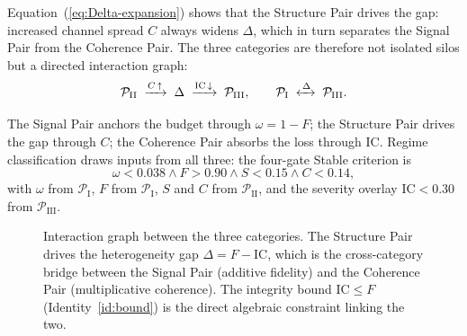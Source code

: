 \documentclass[
  aps,
  prd,
  twocolumn,
  superscriptaddress,
  nofootinbib,
  floatfix
]{revtex4-2}
\newcommand{\IC}{\mathrm{IC}}
\begin{document}
Equation~(\ref{eq:Delta-expansion}) shows that the Structure
Pair drives the gap: increased channel spread $C$ always widens
$\Delta$, which in turn separates the Signal Pair from the
Coherence Pair.  The three categories are therefore not isolated
silos but a directed interaction graph:
\begin{equation}\label{eq:graph}
  \mathcal{P}_{\mathrm{II}} \;\xrightarrow{C\,\uparrow}\; \Delta \;\xrightarrow{\IC\,\downarrow}\; \mathcal{P}_{\mathrm{III}},
  \qquad
  \mathcal{P}_{\mathrm{I}} \;\xleftrightarrow{\,\Delta\,}\; \mathcal{P}_{\mathrm{III}}.
\end{equation}

The Signal Pair anchors the budget through $\omega=1-F$; the
Structure Pair drives the gap through $C$; the Coherence Pair
absorbs the loss through $\IC$.  Regime classification draws
inputs from all three: the four-gate Stable criterion is
\begin{equation}\label{eq:gates}
  \omega < 0.038 \wedge F > 0.90 \wedge S < 0.15 \wedge C < 0.14,
\end{equation}
with $\omega$ from $\mathcal{P}_{\mathrm{I}}$, $F$ from
$\mathcal{P}_{\mathrm{I}}$, $S$ and $C$ from
$\mathcal{P}_{\mathrm{II}}$, and the severity overlay
$\IC<0.30$ from $\mathcal{P}_{\mathrm{III}}$.

\begin{figure}[t]
\centering
{}
\caption{Interaction graph between the three categories.  The
Structure Pair drives the heterogeneity gap $\Delta=F-\IC$, which
is the cross-category bridge between the Signal Pair (additive
fidelity) and the Coherence Pair (multiplicative coherence).
The integrity bound $\IC\le F$ (Identity~\ref{id:bound}) is the
direct algebraic constraint linking the two.}
\label{fig:graph}
\end{figure}
\end{document}
